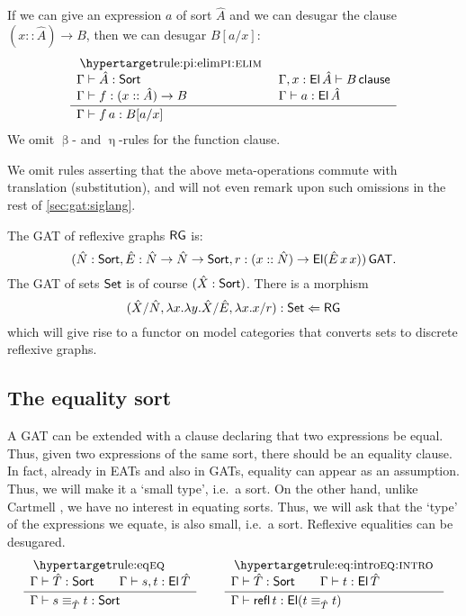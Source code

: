 \documentclass[a4paper]{article}
\begin{document}
If we can give an expression $a$ of sort $\hat A$ and we can desugar the clause $(x :: \hat A) \to B$, then we can desugar $B[a/x]$:
\[
	\inferencel{pi:elim}{
		\Gamma \sez \hat A : \Sort &
		\Gamma, x : \El\,\hat A \sez B \clause \\
		\Gamma \sez f : (x :: \hat A) \to B &
		\Gamma \sez a : \El\,\hat A
	}{
		\Gamma \sez f\,a : B[a/x]
	}{}
\]
We omit $\upbeta$- and $\upeta$-rules for the function clause.

We omit rules asserting that the above meta-operations commute with translation (substitution), and will not even remark upon such omissions in the rest of \cref{sec:gat:siglang}.

\begin{example}
	The GAT of reflexive graphs $\mathsf{RG}$ is:
	\[
		(\hat N : {\mathsf{Sort}}, \hat E : \hat N \to \hat N \to {\mathsf{Sort}}, r : (x :: \hat N) \to {\mathsf{El}}(\hat E\,x\,x)) \,\mathsf{GAT}.
	\]
	The GAT of sets $\mathsf{Set}$ is of course $(\hat X : {\mathsf{Sort}})$.
	There is a morphism
	\[
		(\hat X / \hat N, \lambda x.\lambda y.\hat X / \hat E, \lambda x . x / r) : \mathsf{Set} \Leftarrow \mathsf{RG}
	\]
	which will give rise to a functor on model categories that converts sets to discrete reflexive graphs.
\end{example}

\subsection{The equality sort}
A GAT can be extended with a clause declaring that two expressions be equal.
Thus, given two expressions of the same sort, there should be an equality clause.
In fact, already in EATs and also in GATs, equality can appear as an assumption.
Thus, we will make it a `small type', i.e.\ a sort.
On the other hand, unlike Cartmell \cite{gat,gat-phd}, we have no interest in equating sorts. Thus, we will ask that the `type' of the expressions we equate, is also small, i.e.\ a sort.
Reflexive equalities can be desugared.
\[
	\inferencel{eq}{
		\Gamma \sez \hat T : \Sort \qquad
		\Gamma \sez s, t : \El\,\hat T
	}{
		\Gamma \sez \idtp{\hat T} s t : \Sort
	}{}
	\qquad
	\inferencel{eq:intro}{
		\Gamma \sez \hat T : \Sort \qquad
		\Gamma \sez t : \El\,\hat T
	}{
		\Gamma \sez \refl\,t : \El(\idtp{\hat T} t t)
	}{}
\]
\end{document}
